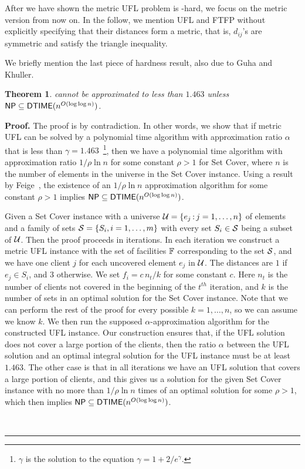 \documentclass[oneside,final]{ucr}
\newtheorem{theorem}{Theorem}
\newenvironment{proof}[1][Proof]{\textbf{#1.} }{\ \rule{0.5em}{0.5em}}
\begin{document}
After we have shown the metric UFL problem is {\MaxSNP}-hard,
we focus on the metric version from now on. In the follow,
we mention UFL and FTFP without explicitly specifying that
their distances form a metric, that is, $d_{ij}$'s are
symmetric and satisfy the triangle inequality.

We briefly mention the last piece of hardness result, also
due to Guha and Khuller.
\begin{theorem}\label{thm:1463}
  {\UFL} cannot be approximated to less than $1.463$ unless ${\mbox{\sf NP}}
  \subseteq {\mbox{\sf DTIME}}(n^{O(\log\log n)})$.
\end{theorem}

\begin{proof}
  The proof is by contradiction. In other words, we show
  that if metric UFL can be solved by a polynomial time
  algorithm with approximation ratio $\alpha$ that is less
  than $\gamma = 1.463$~\footnote{$\gamma$ is the solution to
    the equation $\gamma = 1 + 2/e^\gamma$.}, then we have a
  polynomial time algorithm with approximation ratio $1/\rho
  \ln n$ for some constant $\rho > 1$ for Set Cover, where
  $n$ is the number of elements in the universe in the Set
  Cover instance. Using a result by Feige~\cite{Feige98},
  the existence of an $1/\rho \ln n$ approximation algorithm
  for some constant $\rho > 1$ implies ${\mbox{\sf NP}} \subseteq
  {\mbox{\sf DTIME}}(n^{O(\log\log n)})$.

  Given a Set Cover instance with a universe $\calU = \{e_j
  \suchthat j=1,\ldots, n\}$ of elements and a family of
  sets $\calS = \{S_i, i=1,\ldots,m\}$ with every set $S_i
  \in \calS$ being a subset of $\calU$. Then the proof
  proceeds in iterations. In each iteration we construct a
  metric UFL instance with the set of facilities $\mathbb{F}$
  corresponding to the set $\calS$, and we have one client
  $j$ for each uncovered element $e_j$ in $\calU$. The
  distances are $1$ if $e_j \in S_i$, and $3$ otherwise. We
  set $f_i = c\,n_t / k$ for some constant $c$.  Here $n_t$
  is the number of clients not covered in the beginning of
  the $t^{th}$ iteration, and $k$ is the number of sets in
  an optimal solution for the Set Cover instance. Note that
  we can perform the rest of the proof for every possible
  $k=1,\ldots,n$, so we can assume we know $k$. We then run
  the supposed $\alpha$-approximation algorithm for the
  constructed UFL instance. Our construction ensures that,
  if the UFL solution does not cover a large portion of the
  clients, then the ratio $\alpha$ between the UFL solution
  and an optimal integral solution for the UFL instance must
  be at least $1.463$. The other case is that in all
  iterations we have an UFL solution that covers a large
  portion of clients, and this gives us a solution for the
  given Set Cover instance with no more than $1/\rho \ln n$
  times of an optimal solution for some $\rho > 1$, which
  then implies ${\mbox{\sf NP}} \subseteq {\mbox{\sf DTIME}}(n^{O(\log\log n)})$.


\end{proof}
\end{document}

